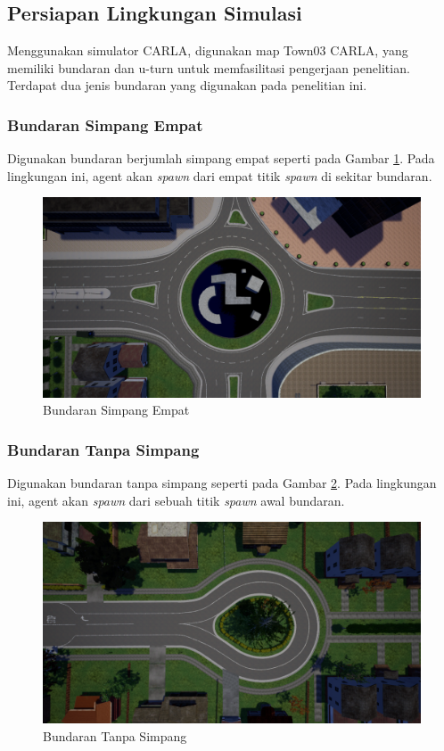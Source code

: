 \documentclass[conference]{IEEEtran}
\begin{document}
\subsection{Persiapan Lingkungan Simulasi}
\label{sec:simulasi}
Menggunakan simulator CARLA, digunakan map Town03 CARLA, yang memiliki bundaran dan u-turn untuk memfasilitasi pengerjaan penelitian. Terdapat dua jenis bundaran yang digunakan pada penelitian ini.

\subsubsection{Bundaran Simpang Empat}
Digunakan bundaran berjumlah simpang empat seperti pada Gambar  \ref{fig:bundaran_town03}. Pada lingkungan ini, agent akan \textit{spawn }dari empat titik \textit{spawn} di sekitar bundaran.
\begin{figure}[H] 
	\centering
	\includegraphics[width=1\linewidth]{images/bundaran}
	\caption{Bundaran Simpang Empat}
	\label{fig:bundaran_town03}
\end{figure}

\subsubsection{Bundaran Tanpa Simpang}
Digunakan bundaran tanpa simpang seperti pada Gambar  \ref{fig:bundaran_tanpa_simpang}. Pada lingkungan ini, agent akan \textit{spawn }dari sebuah titik \textit{spawn} awal bundaran.
\begin{figure}[H] 
	\centering
	\includegraphics[width=1\linewidth]{images/bundaran_tanpa_simpang}
	\caption{Bundaran Tanpa Simpang}
	\label{fig:bundaran_tanpa_simpang}
\end{figure}
\end{document}
